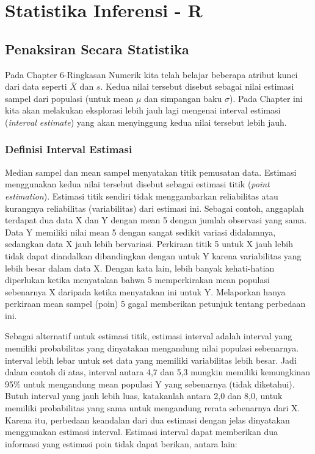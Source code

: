 \documentclass[]{book}
\begin{document}
\part*{Statistika Inferensi -
R}\label{part-statistika-inferensi---r}

\chapter{Penaksiran Secara
Statistika}\label{penaksiran-secara-statistika}

Pada Chapter 6-Ringkasan Numerik kita telah belajar beberapa atribut
kunci dari data seperti \(\overline{X}\) dan \(s\). Kedua nilai tersebut
disebut sebagai nilai estimasi sampel dari populasi (untuk mean \(\mu\)
dan simpangan baku \(\sigma\)). Pada Chapter ini kita akan melakukan
eksplorasi lebih jauh lagi mengenai interval estimasi (\emph{interval
estimate}) yang akan menyinggung kedua nilai tersebut lebih jauh.

\section{Definisi Interval Estimasi}\label{definisi-interval-estimasi}

Median sampel dan mean sampel menyatakan titik pemusatan data. Estimasi
menggunakan kedua nilai tersebut disebut sebagai estimasi titik
(\emph{point estimation}). Estimasi titik sendiri tidak menggambarkan
reliabilitas atau kurangnya reliabilitas (variabilitas) dari estimasi
ini. Sebagai contoh, anggaplah terdapat dua data X dan Y dengan mean 5
dengan jumlah observasi yang sama. Data Y memiliki nilai mean 5 dengan
sangat sedikit variasi didalamnya, sedangkan data X jauh lebih
bervariasi. Perkiraan titik 5 untuk X jauh lebih tidak dapat diandalkan
dibandingkan dengan untuk Y karena variabilitas yang lebih besar dalam
data X. Dengan kata lain, lebih banyak kehati-hatian diperlukan ketika
menyatakan bahwa 5 memperkirakan mean populasi sebenarnya X daripada
ketika menyatakan ini untuk Y. Melaporkan hanya perkiraan mean sampel
(poin) 5 gagal memberikan petunjuk tentang perbedaan ini.

Sebagai alternatif untuk estimasi titik, estimasi interval adalah
interval yang memiliki probabilitas yang dinyatakan mengandung nilai
populasi sebenarnya. interval lebih lebar untuk set data yang memiliki
variabilitas lebih besar. Jadi dalam contoh di atas, interval antara 4,7
dan 5,3 mungkin memiliki kemungkinan 95\% untuk mengandung mean populasi
Y yang sebenarnya (tidak diketahui). Butuh interval yang jauh lebih
luas, katakanlah antara 2,0 dan 8,0, untuk memiliki probabilitas yang
sama untuk mengandung rerata sebenarnya dari X. Karena itu, perbedaan
keandalan dari dua estimasi dengan jelas dinyatakan menggunakan estimasi
interval. Estimasi interval dapat memberikan dua informasi yang estimasi
poin tidak dapat berikan, antara lain:
\end{document}
